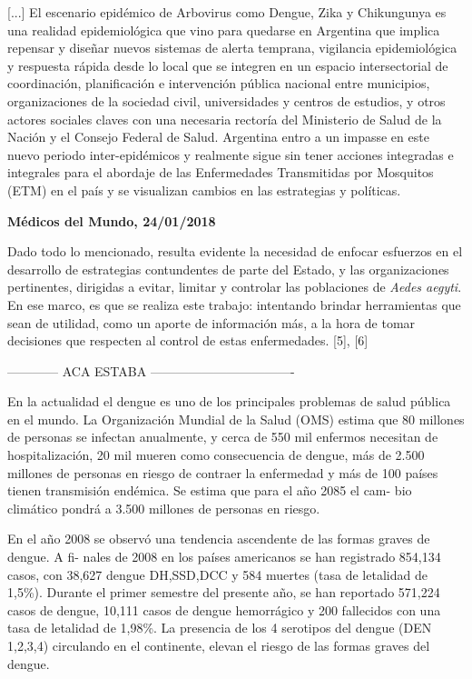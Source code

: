 \begin{framed}

[...] El escenario epidémico de Arbovirus como Dengue, Zika y Chikungunya es una
realidad epidemiológica que vino para quedarse en Argentina que implica repensar
y diseñar nuevos sistemas de alerta temprana, vigilancia epidemiológica y
respuesta rápida desde lo local que se integren en un espacio intersectorial de
coordinación, planificación e intervención pública nacional entre municipios,
organizaciones de la sociedad civil, universidades y centros de estudios, y
otros actores sociales claves con una necesaria rectoría del
Ministerio de Salud de la Nación y el Consejo Federal de Salud.
Argentina entro a un impasse en este nuevo periodo inter-epidémicos y realmente
sigue sin tener acciones integradas e integrales para el abordaje de las
Enfermedades Transmitidas por Mosquitos (ETM) en el país y se visualizan
cambios en las estrategias y políticas.

\centering \textbf{Médicos del Mundo, 24/01/2018}
\end{framed}


\par Dado todo lo mencionado, resulta evidente la necesidad de enfocar esfuerzos
en el desarrollo de estrategias contundentes de parte del Estado,
y las organizaciones pertinentes, dirigidas a evitar, limitar y controlar las
poblaciones de \textit{Aedes aegyti}.
En ese marco, es que se realiza este trabajo: intentando brindar herramientas
que sean de utilidad, como un aporte de información más, a la hora de tomar
decisiones que respecten al control de estas enfermedades. [5], [6]


------------ ACA ESTABA ----------------------------------


En la actualidad el dengue es uno de los principales problemas de salud pública en el mundo.
La  Organización  Mundial  de  la  Salud  (OMS)  estima  que  80  millones  de  personas  se  infectan
anualmente,  y  cerca  de  550  mil  enfermos  necesitan  de  hospitalización,  20  mil  mueren  como
consecuencia de dengue, más de 2.500 millones de personas en riesgo de contraer la enfermedad
y más de 100 países tienen transmisión endémica. Se estima que para el año 2085 el cam-
bio climático pondrá a 3.500 millones de personas en riesgo.


En  el  año  2008  se  observó  una  tendencia  ascendente  de  las  formas  graves  de  dengue.  A  fi-
nales  de  2008  en  los  países  americanos  se  han  registrado  854,134  casos,  con  38,627  dengue
DH,SSD,DCC y 584 muertes (tasa de letalidad de 1,5\%). Durante el  primer semestre del presente
año, se han reportado 571,224 casos de dengue, 10,111 casos de dengue hemorrágico y 200
fallecidos con una tasa de letalidad de 1,98\%. La presencia de los 4 serotipos del dengue (DEN
1,2,3,4) circulando en el continente, elevan el riesgo de las formas graves del dengue.



